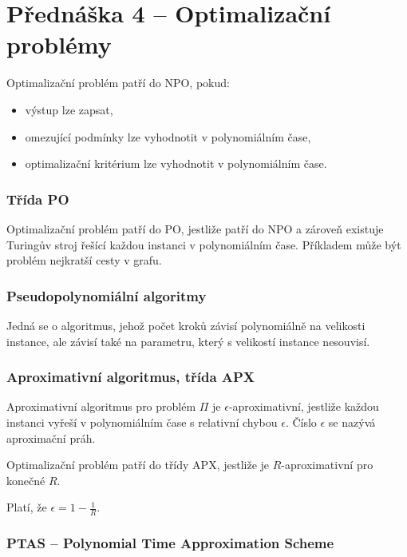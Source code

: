 \section{Přednáška 4 -- Optimalizační problémy}

Optimalizační problém patří do NPO, pokud:

\begin{itemize}
    \item výstup lze zapsat,
    \item omezující podmínky lze vyhodnotit v polynomiálním čase,
    \item optimalizační kritérium lze vyhodnotit v polynomiálním čase.
\end{itemize}

\subsubsection*{Třída PO}

Optimalizační problém patří do PO, jestliže patří do NPO a zároveň existuje Turingův stroj řešící každou instanci v polynomiálním čase.
Příkladem může být problém nejkratší cesty v grafu.

\subsubsection*{Pseudopolynomiální algoritmy}

Jedná se o algoritmus, jehož počet kroků závisí polynomiálně na velikosti instance, ale závisí také na parametru, který s velikostí instance nesouvisí.

\subsubsection*{Aproximativní algoritmus, třída APX}

Aproximativní algoritmus pro problém $\Pi$ je $\epsilon$-aproximativní, jestliže každou instanci vyřeší v polynomiálním čase s relativní chybou $\epsilon$.
Číslo $\epsilon$ se nazývá aproximační práh.

Optimalizační problém patří do třídy APX, jestliže je $R$-aproximativní pro konečné $R$.

Platí, že $\epsilon = 1 - \frac{1}{R}$.

\subsubsection{PTAS -- Polynomial Time Approximation Scheme}

